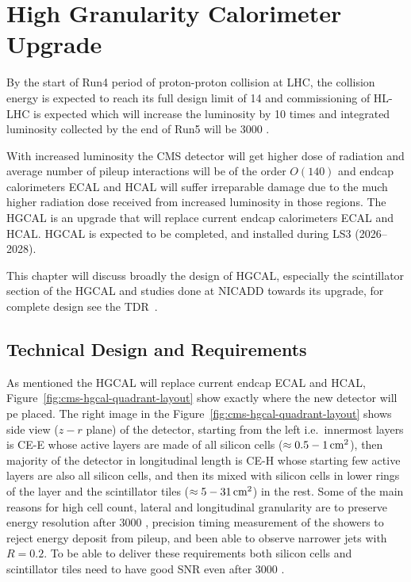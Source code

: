 \chapter{
  High Granularity Calorimeter Upgrade
 }\label{ch_hgcal}

By the start of Run4 period of proton-proton collision
at \gls{LHC}, the collision energy is expected to
reach its full design limit of 14 \TeV{} and
commissioning of \gls{HL-LHC} is expected which will
increase the luminosity by 10 times and
integrated luminosity collected by the end of Run5 will be 3000 \fbinv{}.

With increased luminosity the \gls{CMS} detector will get
higher dose of radiation and average number of pileup interactions
will be of the order \( O(140) \) and endcap calorimeters \gls{ECAL} and \gls{HCAL} will suffer
irreparable damage due to the much higher radiation dose received
from increased luminosity in those regions.
The \gls{HGCAL} is an upgrade that will replace current endcap calorimeters
\gls{ECAL} and \gls{HCAL}.
\gls{HGCAL} is expected to be completed, and installed
during \gls{LS3} (2026--2028).

This chapter will discuss broadly the design
of \gls{HGCAL}, especially the scintillator section of the \gls{HGCAL}
and studies done at \gls{NICADD} towards its upgrade,
for complete design see the \gls{TDR}~\cite{cms-hgcal-tdr}.

\section{
  Technical Design and Requirements
 }\label{ch_hgcal:technical-design}

As mentioned the \gls{HGCAL} will replace current endcap \gls{ECAL} and
\gls{HCAL}, Figure~\ref{fig:cms-hgcal-quadrant-layout}
show exactly where the new detector will pe placed. The right image in the
Figure~\ref{fig:cms-hgcal-quadrant-layout} shows side view (\( z-r \) plane)
of the detector, starting from the left i.e.~innermost layers is
\gls{CE-E} whose active layers are made of all silicon cells
(\( \approx 0.5-1 \,\text{cm}{}^2\)), then
majority of the detector in longitudinal length is \gls{CE-H}
whose starting few active layers are also all silicon cells, and
then its mixed with silicon cells in lower rings of the
layer and the scintillator tiles (\( \approx 5-31 \,\text{cm}{}^2\)) in the rest.
Some of the main reasons for high cell count, lateral and longitudinal granularity
are to preserve energy resolution after 3000 \fbinv{}, precision
timing measurement of the showers to reject energy deposit from pileup, and
been able to observe narrower jets with \( R = 0.2 \).
To be able to deliver these requirements both silicon cells and scintillator tiles
need to have good \gls{SNR} even after 3000 \fbinv{}.

